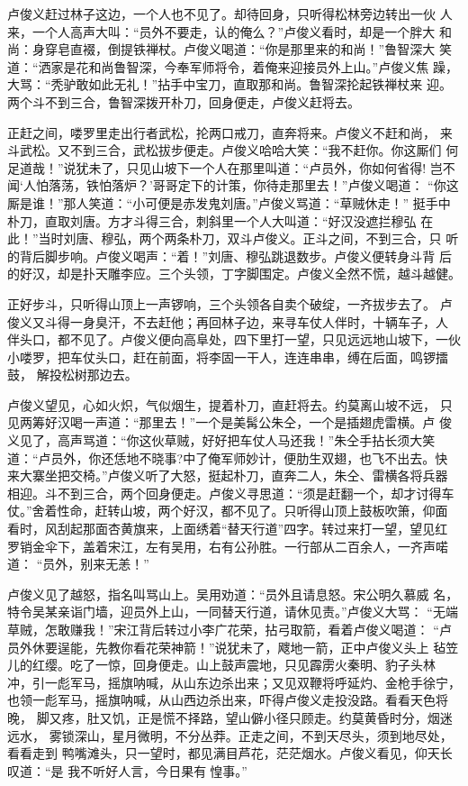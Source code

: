 卢俊义赶过林子这边，一个人也不见了。却待回身，只听得松林旁边转出一伙
人来，一个人高声大叫：“员外不要走，认的俺么？”卢俊义看时，却是一个胖大
和尚：身穿皂直裰，倒提铁禅杖。卢俊义喝道：“你是那里来的和尚！”鲁智深大
笑道：“洒家是花和尚鲁智深，今奉军师将令，着俺来迎接员外上山。”卢俊义焦
躁，大骂：“秃驴敢如此无礼！”拈手中宝刀，直取那和尚。鲁智深抡起铁禅杖来
迎。两个斗不到三合，鲁智深拨开朴刀，回身便走，卢俊义赶将去。

正赶之间，喽罗里走出行者武松，抡两口戒刀，直奔将来。卢俊义不赶和尚，
来斗武松。又不到三合，武松拔步便走。卢俊义哈哈大笑：“我不赶你。你这厮们
何足道哉！”说犹未了，只见山坡下一个人在那里叫道：“卢员外，你如何省得!
岂不闻‘人怕落荡，铁怕落炉？’哥哥定下的计策，你待走那里去！”卢俊义喝道：
“你这厮是谁！”那人笑道：“小可便是赤发鬼刘唐。”卢俊义骂道：“草贼休走！”
挺手中朴刀，直取刘唐。方才斗得三合，刺斜里一个人大叫道：“好汉没遮拦穆弘
在此！”当时刘唐、穆弘，两个两条朴刀，双斗卢俊义。正斗之间，不到三合，只
听的背后脚步响。卢俊义喝声：“着！”刘唐、穆弘跳退数步。卢俊义便转身斗背
后的好汉，却是扑天雕李应。三个头领，丁字脚围定。卢俊义全然不慌，越斗越健。

正好步斗，只听得山顶上一声锣响，三个头领各自卖个破绽，一齐拔步去了。
卢俊义又斗得一身臭汗，不去赶他；再回林子边，来寻车仗人伴时，十辆车子，人
伴头口，都不见了。卢俊义便向高阜处，四下里打一望，只见远远地山坡下，一伙
小喽罗，把车仗头口，赶在前面，将李固一干人，连连串串，缚在后面，鸣锣擂鼓，
解投松树那边去。

卢俊义望见，心如火炽，气似烟生，提着朴刀，直赶将去。约莫离山坡不远，
只见两筹好汉喝一声道：“那里去！”一个是美髯公朱仝，一个是插翅虎雷横。卢
俊义见了，高声骂道：“你这伙草贼，好好把车仗人马还我！”朱仝手拈长须大笑
道：“卢员外，你还恁地不晓事?中了俺军师妙计，便肋生双翅，也飞不出去。快
来大寨坐把交椅。”卢俊义听了大怒，挺起朴刀，直奔二人，朱仝、雷横各将兵器
相迎。斗不到三合，两个回身便走。卢俊义寻思道：“须是赶翻一个，却才讨得车
仗。”舍着性命，赶转山坡，两个好汉，都不见了。只听得山顶上鼓板吹箫，仰面
看时，风刮起那面杏黄旗来，上面绣着“替天行道”四字。转过来打一望，望见红
罗销金伞下，盖着宋江，左有吴用，右有公孙胜。一行部从二百余人，一齐声喏道：
“员外，别来无恙！”

卢俊义见了越怒，指名叫骂山上。吴用劝道：“员外且请息怒。宋公明久慕威
名，特令吴某亲诣门墙，迎员外上山，一同替天行道，请休见责。”卢俊义大骂：
“无端草贼，怎敢赚我！”宋江背后转过小李广花荣，拈弓取箭，看着卢俊义喝道：
“卢员外休要逞能，先教你看花荣神箭！”说犹未了，飕地一箭，正中卢俊义头上
毡笠儿的红缨。吃了一惊，回身便走。山上鼓声震地，只见霹雳火秦明、豹子头林
冲，引一彪军马，摇旗呐喊，从山东边杀出来；又见双鞭将呼延灼、金枪手徐宁，
也领一彪军马，摇旗呐喊，从山西边杀出来，吓得卢俊义走投没路。看看天色将晚，
脚又疼，肚又饥，正是慌不择路，望山僻小径只顾走。约莫黄昏时分，烟迷远水，
雾锁深山，星月微明，不分丛莽。正走之间，不到天尽头，须到地尽处，看看走到
鸭嘴滩头，只一望时，都见满目芦花，茫茫烟水。卢俊义看见，仰天长叹道：“是
我不听好人言，今日果有惶事。”

